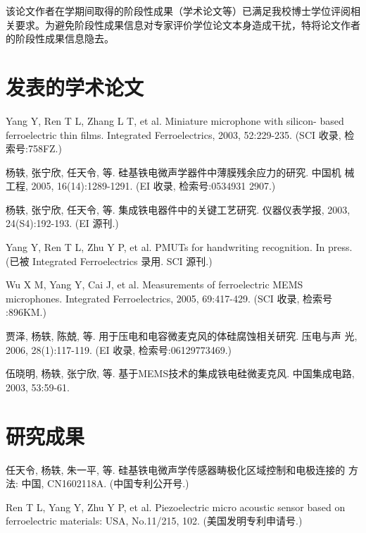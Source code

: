 \begin{resume}
\ifreview
该论文作者在学期间取得的阶段性成果（学术论文等）已满足我校博士学位评阅相关要求。为避免阶段性成果信息对专家评价学位论文本身造成干扰，特将论文作者的阶段性成果信息隐去。
\else
  \section*{发表的学术论文} %

  \begin{enumerate}[label={[\arabic*]}]
  \addtolength{\itemsep}{-.36\baselineskip}%
  \item Yang Y, Ren T L, Zhang L T, et al. Miniature microphone with silicon-
    based ferroelectric thin films. Integrated Ferroelectrics, 2003,
    52:229-235. (SCI 收录, 检索号:758FZ.)
  \item 杨轶, 张宁欣, 任天令, 等. 硅基铁电微声学器件中薄膜残余应力的研究. 中国机
    械工程, 2005, 16(14):1289-1291. (EI 收录, 检索号:0534931 2907.)
  \item 杨轶, 张宁欣, 任天令, 等. 集成铁电器件中的关键工艺研究. 仪器仪表学报,
    2003, 24(S4):192-193. (EI 源刊.)
  \item Yang Y, Ren T L, Zhu Y P, et al. PMUTs for handwriting recognition. In
    press. (已被 Integrated Ferroelectrics 录用. SCI 源刊.)
  \item Wu X M, Yang Y, Cai J, et al. Measurements of ferroelectric MEMS
    microphones. Integrated Ferroelectrics, 2005, 69:417-429. (SCI 收录, 检索号
    :896KM.)
  \item 贾泽, 杨轶, 陈兢, 等. 用于压电和电容微麦克风的体硅腐蚀相关研究. 压电与声
    光, 2006, 28(1):117-119. (EI 收录, 检索号:06129773469.)
  \item 伍晓明, 杨轶, 张宁欣, 等. 基于MEMS技术的集成铁电硅微麦克风. 中国集成电路, 
    2003, 53:59-61.
  \end{enumerate}

  \section*{研究成果} %
  \begin{enumerate}[label=\textbf{[\arabic*]}]
  \addtolength{\itemsep}{-.36\baselineskip}%
  \item 任天令, 杨轶, 朱一平, 等. 硅基铁电微声学传感器畴极化区域控制和电极连接的
    方法: 中国, CN1602118A. (中国专利公开号.)
  \item Ren T L, Yang Y, Zhu Y P, et al. Piezoelectric micro acoustic sensor
    based on ferroelectric materials: USA, No.11/215, 102. (美国发明专利申请号.)
  \end{enumerate}
\fi
\end{resume}
